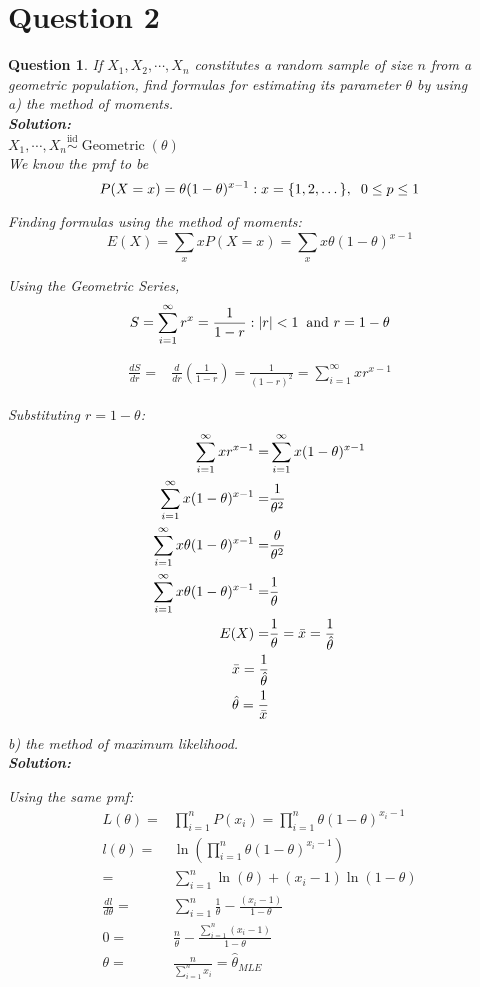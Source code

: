 \documentclass{article}
\theoremstyle{questionstyle}
\newtheorem{myquestion}{Question}
\begin{document}
\section{Question 2}
\begin{myquestion}
If \(X_1, X_2, \cdots, X_n\) constitutes a random sample of size \(n\) from a geometric population, find formulas for estimating its parameter \(\theta\) by using\\

a) the method of moments.\\
\textbf{Solution:}\\ 
\(X_1, \cdots, X_n \overset{\text{iid}}{\sim} \operatorname{Geometric}(\theta)\)\\ 
We know the pmf to be \[ P(X=x) = \theta(1-\theta)^{x-1} : x = \{1,2,\dots\},\hspace{.2cm} 0 \leq p \leq 1 \]

Finding formulas using the method of moments:
\[
    E(X) = \sum_{x} x P(X=x) = \sum_{x} x \theta(1-\theta)^{x-1}
\]

Using the Geometric Series, \[S = \sum_{i=1}^{\infty}r^x = \frac{1}{1-r} : |r|<1 \hspace{.2cm} \text{and } r = 1-\theta \]

\begin{align*}
    \frac{dS}{dr} =& \frac{d}{dr}\left( \frac{1}{1-r}\right) = \frac{1}{(1-r)^2} = \sum_{i=1}^{\infty} xr^{x-1}
\end{align*}

Substituting \(r = 1-\theta\):
\begin{align*}
    \sum_{i=1}^{\infty} xr^{x-1} =& \sum_{i=1}^{\infty} x(1-\theta)^{x-1}\\
    \sum_{i=1}^{\infty} x(1-\theta)^{x-1} =& \frac{1}{\theta^2}\\
    \sum_{i=1}^{\infty} x\theta(1-\theta)^{x-1} =& \frac{\theta}{\theta^2}\\
    \sum_{i=1}^{\infty} x\theta(1-\theta)^{x-1} =& \frac{1}{\theta}\\
    E(X) =& \frac{1}{\theta} = \Bar{x} = \frac{1}{\hat{\theta}}\\
    \Bar{x} = \frac{1}{\hat{\theta}}\\
    \hat{\theta} = \frac{1}{\Bar{x}}
\end{align*}

b) the method of maximum likelihood.\\
\textbf{Solution:}

Using the same pmf: 
\begin{align*}
    L(\theta) =& \prod_{i=1}^n P(x_i) = \prod_{i=1}^n \theta(1-\theta)^{x_i-1}\\
    l(\theta) =& \ln\left( \prod_{i=1}^n \theta(1-\theta)^{x_i-1} \right)\\
    =& \sum_{i=1}^n \ln(\theta) + (x_i -1)\ln(1-\theta)\\
    \frac{dl}{d\theta} =& \sum_{i=1}^n \frac{1}{\theta} - \frac{(x_i-1)}{1-\theta}\\
    0 =& \frac{n}{\theta} - \frac{\sum_{i=1}^n (x_i -1)}{1-\theta}\\
    \theta =& \frac{n}{\sum_{i=1}^{n} x_i} = \hat{\theta}_{MLE}
\end{align*}


\end{myquestion}
\end{document}
